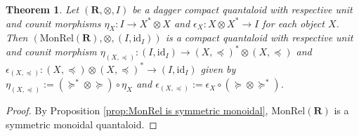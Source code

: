 \documentclass[10pt,a4paper]{amsart}
\newtheorem{theorem}{Theorem}
\newcommand{\id}{\mathrm{id}}
\newcommand{\qo}{{\boldsymbol{\preccurlyeq}}}
\newcommand{\qop}{{\boldsymbol{\succcurlyeq}}}
\begin{document}
\begin{theorem}
    Let $(\mathbf R,\otimes,I)$ be a dagger compact quantaloid with respective unit and counit morphisms $\eta_X:I\to X^*\otimes X$ and $\epsilon_X:X\otimes X^*\to I$ for each object $X$. Then $(\mathrm{MonRel}(\mathbf R),\otimes,(I,\id_I))$ is a compact quantaloid with respective unit and counit morphism $\eta_{(X,\qo)}:(I,\id_I)\to (X,\qo)^*\otimes(X,\qo)$ and $\epsilon_{(X,\qo)}:(X,\qo)\otimes(X,\qo)^*\to(I,\id_I)$ given by $\eta_{(X,\qo)}:=(\qop^*\otimes\qop)\circ\eta_X$ and $\epsilon_{(X,\qo)}:=\epsilon_X\circ(\qop\otimes\qop^*)$.
\end{theorem}

\begin{proof}
By Proposition \ref{prop:MonRel is symmetric monoidal}, $\mathrm{MonRel}(\mathbf R)$ is a symmetric monoidal quantaloid. 


\end{proof}
\end{document}
